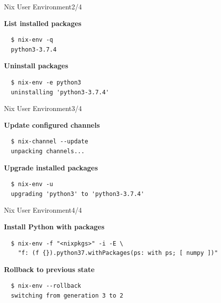\documentclass[12pt,aspectratio=169]{beamer}
\begin{document}

\begin{frame}[fragile]{Nix User Environment\hfill2/4}

  \textbf{List installed packages}
  \begin{verbatim}
  $ nix-env -q
  python3-3.7.4
  \end{verbatim}

  \textbf{Uninstall packages}
  \begin{verbatim}
  $ nix-env -e python3
  uninstalling 'python3-3.7.4'
  \end{verbatim}

\end{frame}


\begin{frame}[fragile]{Nix User Environment\hfill3/4}

  \textbf{Update configured channels}
  \begin{verbatim}
  $ nix-channel --update
  unpacking channels...
  \end{verbatim}

  \textbf{Upgrade installed packages}
  \begin{verbatim}
  $ nix-env -u
  upgrading 'python3' to 'python3-3.7.4'
  \end{verbatim}

\end{frame}


\begin{frame}[fragile]{Nix User Environment\hfill4/4}

  \textbf{Install Python with packages}
  \begin{verbatim}
  $ nix-env -f "<nixpkgs>" -i -E \
    "f: (f {}).python37.withPackages(ps: with ps; [ numpy ])"
  \end{verbatim}

  \textbf{Rollback to previous state}
  \begin{verbatim}
  $ nix-env --rollback
  switching from generation 3 to 2
  \end{verbatim}

\end{frame}

\end{document}
